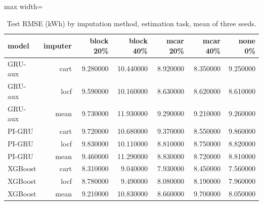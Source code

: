 \begin{table}[H]
\centering\small
\caption{Test RMSE (kWh) by imputation method, estimation task, mean of three seeds.}\label{tab:imputation}
\begin{adjustbox}{max width=\textwidth}
\begin{tabular}{lrrrrrr}
\toprule
model & imputer & block 20\% & block 40\% & mcar 20\% & mcar 40\% & none 0\% \\
\midrule
GRU-aux & cart & 9.280000 & 10.440000 & 8.920000 & 8.350000 & 9.250000 \\
GRU-aux & locf & 9.590000 & 10.160000 & 8.630000 & 8.620000 & 8.610000 \\
GRU-aux & mean & 9.730000 & 11.930000 & 9.290000 & 9.210000 & 9.260000 \\
PI-GRU & cart & 9.720000 & 10.680000 & 9.370000 & 8.550000 & 9.860000 \\
PI-GRU & locf & 9.830000 & 10.110000 & 8.810000 & 8.750000 & 8.820000 \\
PI-GRU & mean & 9.460000 & 11.290000 & 8.830000 & 8.720000 & 8.810000 \\
XGBoost & cart & 8.310000 & 9.040000 & 7.930000 & 8.450000 & 7.560000 \\
XGBoost & locf & 8.780000 & 9.490000 & 8.080000 & 8.190000 & 7.960000 \\
XGBoost & mean & 9.210000 & 10.830000 & 8.660000 & 9.700000 & 8.050000 \\
\bottomrule
\end{tabular}
\end{adjustbox}
\end{table}
